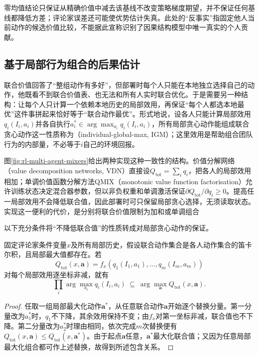 零均值结论只保证从精确价值中减去该基线不改变策略梯度期望，并不保证任何基线都降低方差；评论家误差还可能使优势估计失真。此处的“反事实”指固定他人当前动作的候选价值比较，不能据此宣称识别了因果结构模型中唯一真实的个人贡献。

\subsection{基于局部行为组合的后果估计}
\label{sec:rl-multi-agent-factorization}

联合价值回答了“整组动作有多好”，但部署时每个人只能在本地独立选择自己的动作，他既看不到联合价值表、也无法和所有人实时联合优化。于是需要另一种结构：让每个人只计算一个依赖本地历史的局部效用，再保证“每个人都选本地最优”这件事拼起来恰好等于“联合动作最优”。形式地说，设各人只能计算局部效用$q_i(I_i,a_i)$并各自执行$a_i^*\in\arg\max_{a_i}q_i(I_i,a_i)$，所有局部贪心动作能组成联合贪心动作这一性质称为（individual-global-max, IGM）；这里效用是帮助组合团队行为的内部量，不必等于$i$自己的环境回报。

图\ref{fig:rl-multi-agent-mixers}给出两种实现这种一致性的结构。价值分解网络（value decomposition networks, VDN）直接设$Q_{\text{tot}}=\sum_i q_i$，把各人的局部效用相加；单调价值函数分解方法QMIX（monotonic value function factorisation）允许训练状态决定混合器参数，但以非负权重和单调激活保证$\partial Q_{\text{tot}}/\partial q_i\geq0$。提高任一局部效用不会降低联合值，因此部署时可只保留局部贪心选择，无须读取状态。实现这一便利的代价，是分别将联合价值限制为加和或单调组合

以下充分条件将“不降低联合值”的性质转成对局部贪心动作的保证。

\begin{theorem}[单调组合的局部贪心充分性]
\label{thm:rl-multi-agent-monotone}
固定评论家条件变量$x$及所有局部历史，假设联合动作集合是各人动作集合的笛卡尔积，且局部最大值都存在。若
\[
 Q_{\text{tot}}(x,\bm a)
 =f_x(q_1(I_1,a_1),\ldots,q_m(I_m,a_m))
\]
对每个局部效用逐坐标非减，就有
\[
 \prod_i\arg\max_{a_i}q_i(I_i,a_i)
 \ \subseteq\ \arg\max_{\bm a}Q_{\text{tot}}(x,\bm a).
\]
\end{theorem}
\begin{proof}
任取一组局部最大化动作$\bm a^*$，从任意联合动作$\bm a$开始逐个替换分量。第一分量改为$a_1^*$时，$q_1$不下降，其余效用保持不变；由$f_x$对第一坐标非减，联合值也不下降。第二分量改为$a_2^*$时理由相同，依次完成$m$次替换便有
$Q_{\text{tot}}(x,\bm a)\leq Q_{\text{tot}}(x,\bm a^*)$。由于起点$\bm a$任意，$\bm a^*$最大化联合值；又因为任意局部最大化组合都可作上述替换，故得到所述包含关系。
\end{proof}

